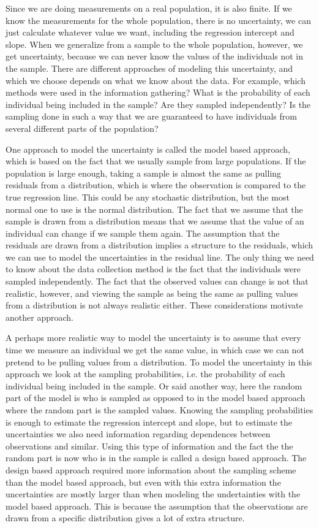 \documentclass{article}
\begin{document}
Since we are doing measurements on a real population, it is also finite.
If we know the measurements for the whole population, there
is no uncertainty, we can just calculate whatever value we
want, including the regression intercept and slope. When we generalize from a sample to the whole population, however, we get
uncertainty, because we can never know the values of the individuals not in the sample. There are different approaches of modeling this uncertainty, and
which we choose depends on what we know about the data. For example, which
methods were used in the information gathering?
What is the probability of each
individual being included in the sample? Are they sampled independently? Is the
sampling done in such a way that we are guaranteed to have individuals from
several different parts of the population?

One approach to model the uncertainty is called the model based approach, which
is based on the fact that we usually sample from large populations. If the
population is large enough, taking a sample is almost the same as pulling
residuals from a distribution, which is where the observation is compared to the
true regression line. This could be any stochastic distribution, but the most
normal one to use is the normal distribution. The fact that we assume that the
sample is drawn from a distribution means that we assume that the value of an
individual can change if we sample them again. The assumption that the residuals
are drawn from a distribution implies a structure to the residuals, which we
can use to model the uncertainties in the residual line. The only thing we need
to know about the data collection method is the fact that the individuals were
sampled independently. The fact that the observed values can change is not that
realistic, however, and viewing the sample as being the same as pulling values
from a distribution is not always realistic either. These considerations
motivate another approach.


A perhaps more realistic way to model the uncertainty is to assume that every time we measure an
individual we get the same value, in which case we can not pretend to be pulling
values from a distribution. To model the uncertainty in this approach we look at
the sampling probabilities, i.e. the probability of each individual being
included in the sample. Or said another way, here the random part of the model
is who is sampled as opposed to in the model based approach where the random
part is the sampled values. Knowing the sampling probabilities is enough to
estimate the regression intercept and slope, but to estimate the uncertainties
we also need information regarding dependences between observations and similar.
Using this type of information and the fact the the random part is now who is in
the sample is called a design based approach. The design based approach required
more information about the sampling scheme than the model based approach, but
even with this extra information the uncertainties are mostly larger than when
modeling the undertainties with the model based approach. This is because the
assumption that the observations are drawn from a specific distribution gives a
lot of extra structure.
\end{document}
